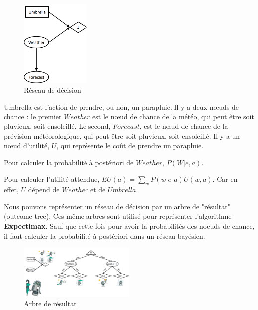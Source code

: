 \begin{example}\leavevmode
    \begin{figure}[H]
        \centering
        \includegraphics[width=0.3\textwidth]{pictures/decisonnet.png}
        \caption{Réseau de décision}\label{fig:decisionnet}
    \end{figure}

    Umbrella est l'action de prendre, ou non, un parapluie. Il y a deux nœuds de chance : le premier $Weather$
    est le nœud de chance de la météo, qui peut être soit pluvieux, soit ensoleillé. 
    Le second, $Forecast$, est le nœud de chance de la prévision météorologique, qui peut être soit pluvieux, soit ensoleillé.
    Il y a un nœud d'utilité, $U$, qui représente le coût de prendre un parapluie.

    Pour calculer la probabilité à postériori de $Weather$, $P(W | e, a)$.

    Pour calculer l'utilité attendue, $EU(a) = \sum_{w} P(w | e, a) U(w, a)$. Car en effet,
    $U$ dépend de $Weather$ et de $Umbrella$.
\end{example}

Nous pouvons représenter un réseau de décision par un arbre de "résultat" (outcome tree). Ces même arbres 
sont utilisé pour représenter l'algorithme \textbf{Expectimax}.
Sauf que cette fois pour avoir la probabilités des noeuds de chance, il faut calculer la probabilité à postériori dans un réseau bayésien.

\begin{figure}[H]
    \begin{center}
        \includegraphics[width=0.5\textwidth]{pictures/decisionnetasoutcometree.png}
    \end{center}
    \caption{Arbre de résultat}\label{fig:decisionnetasoutcometree}
\end{figure}

